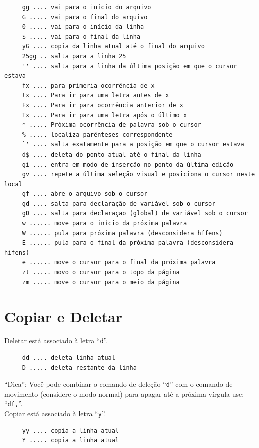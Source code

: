 \documentclass[10pt,a4paper,openany]{book}
\begin{document}
\begin{verbatim}
     gg .... vai para o início do arquivo
     G ..... vai para o final do arquivo
     0 ..... vai para o início da linha
     $ ..... vai para o final da linha
     yG .... copia da linha atual até o final do arquivo
     25gg .. salta para a linha 25
     '' .... salta para a linha da última posição em que o cursor estava
     fx .... para primeria ocorrência de x
     tx .... Para ir para uma letra antes de x
     Fx .... Para ir para ocorrência anterior de x
     Tx .... Para ir para uma letra após o último x
     * ..... Próxima ocorrência de palavra sob o cursor
     % ..... localiza parênteses correspondente
     `' .... salta exatamente para a posição em que o cursor estava
     d$ .... deleta do ponto atual até o final da linha
     gi .... entra em modo de inserção no ponto da última edição
     gv .... repete a última seleção visual e posiciona o cursor neste local
     gf .... abre o arquivo sob o cursor
     gd .... salta para declaração de variável sob o cursor
     gD .... salta para declaraçao (global) de variável sob o cursor
     w ...... move para o início da próxima palavra
     W ...... pula para próxima palavra (desconsidera hífens)
     E ...... pula para o final da próxima palavra (desconsidera hifens)
     e ...... move o cursor para o final da próxima palavra
     zt ..... movo o cursor para o topo da página
     zm ..... move o cursor para o meio da página
\end{verbatim}

\section{Copiar e Deletar}\label{sec:Copiar e Deletar}

Deletar está associado à letra ``\verb|d|''.

\begin{verbatim}
     dd .... deleta linha atual
     D ..... deleta restante da linha
\end{verbatim}


``Dica'': Você pode combinar o comando de deleção ``\verb+d+'' com o
comando de movimento (considere o modo normal) para apagar até a
próxima vírgula use: ``\verb+df,+''. \\


Copiar está associado à letra ``\verb|y|''.

\begin{verbatim}
     yy .... copia a linha atual
     Y ..... copia a linha atual
\end{verbatim}
\end{document}
